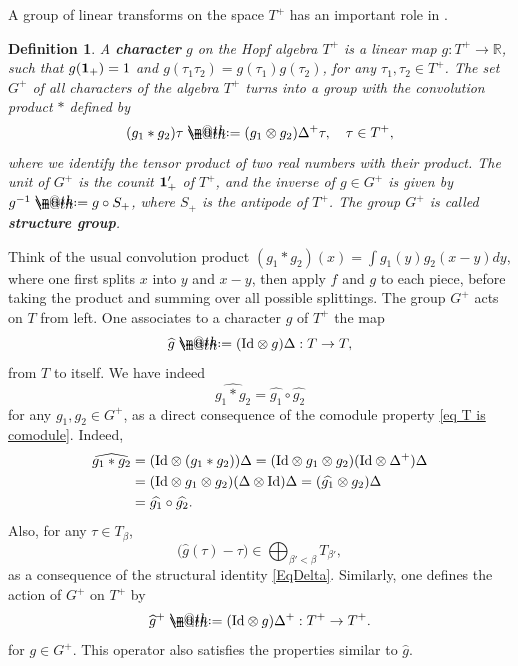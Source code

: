 \documentclass[10pt, reqno]{amsart}
\makeatletter
\numberwithin{subsection}{section}
\numberwithin{subsubsection}{subsection}
\numberwithin{equation}{section} %
\theoremstyle{mystyle}
\theoremstyle{mystyle2}
\newtheorem*{defn*} {Definition}
\theoremstyle{mystyle3}
\newcommand{\iden}{\text{\rm Id}}
\newcommand\bbR{\mathbb{R}}
\newcommand*{\defeq}{\mathrel{\rlap{%
                     \raisebox{0.3ex}{$\m@th\cdot$}}%
                     \raisebox{-0.3ex}{$\m@th\cdot$}}%
                     =}
\makeatother
\begin{document}
\medskip

A group of linear transforms on the space $T^+$ has an important role in \cite{Hai14}. 

\medskip

\begin{defn*}
A \textbf{\textsf{character}} $g$ on the Hopf algebra $T^+$ is a linear map $g:T^+\to\bbR$, such that $g({\bf1}_+)=1$ and $g(\tau_1\tau_2)=g(\tau_1)g(\tau_2)$, for any $\tau_1,\tau_2\in T^+$. 
The set $G^+$ of all characters of the algebra $T^+$ turns into a group with the convolution product $*$ defined by 
$$
(g_1*g_2)\tau \defeq  (g_1\otimes g_2)\Delta^+\tau, \quad \tau\in T^+,
$$
where we identify the tensor product of two real numbers with their product.
The unit of $G^+$ is the counit ${\bf1}_+'$ of $T^+$, and the inverse of $g\in G^+$ is given by $g^{-1}\defeq g\circ S_+$, where $S_+$ is the antipode of $T^+$.
The group $G^+$ is called \textbf{\textsf{structure group}}.
\end{defn*}

\medskip

Think of the usual convolution product $(g_1*g_2)(x) = \int g_1(y)g_2(x-y)dy$, where one first splits $x$ into $y$ and $x-y$, then apply $f$ and $g$ to each piece, before taking the product and summing over all possible splittings. The group $G^+$ acts on $T$ from left. One associates to a character $g$ of $T^+$ the map 
$$
\widehat g \defeq  (\textrm{Id}\otimes g)\Delta : T\to T,
$$ 
from $T$ to itself.  We have indeed
\begin{equation}\label{Section2:GactionAssociative}
\widehat{g_1*g_2} = \widehat{g_1} \circ \widehat{g_2}
\end{equation}
for any $g_1,g_2\in G^+$, as a direct consequence of the comodule property \eqref{eq T is comodule}. Indeed,
\begin{align*}
\widehat{g_1*g_2} &= (\iden\otimes(g_1*g_2))\Delta
=(\iden\otimes g_1\otimes g_2)(\iden\otimes\Delta^+)\Delta\\
&=(\iden\otimes g_1\otimes g_2)(\Delta\otimes\iden)\Delta=
(\widehat{g_1}\otimes g_2)\Delta\\
&=\widehat{g_1} \circ \widehat{g_2}.
\end{align*}
Also, for any $\tau\in T_\beta$,
$$
\Big(\widehat{g}(\tau) - \tau\Big) \in \bigoplus_{\beta'<\beta}T_{\beta'},
$$
as a consequence of the structural identity \eqref{EqDelta}. Similarly, one defines the action of $G^+$ on $T^+$ by
$$
\widehat{g}^+\defeq (\textrm{Id}\otimes g)\Delta^+:T^+\to T^+.
$$
for $g\in G^+$. This operator also satisfies the properties similar to $\widehat{g}$.
\end{document}
